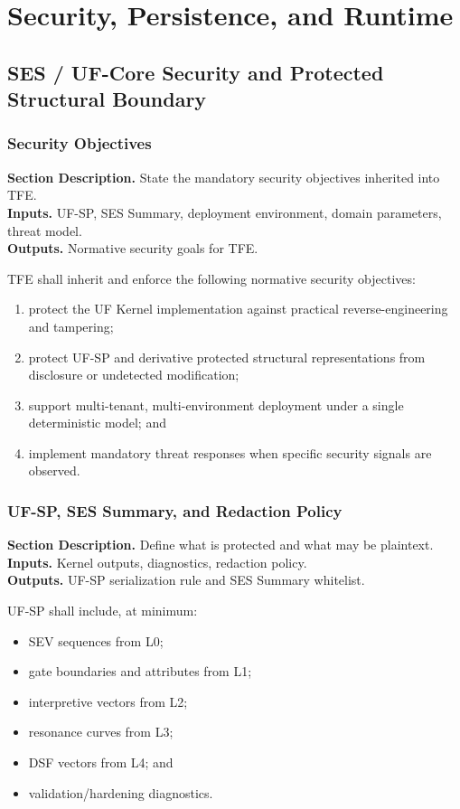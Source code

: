 \documentclass[11pt]{report}
\newcommand{\meta}[3]{\textbf{Section Description.} #1\\
\textbf{Inputs.} #2\\
\textbf{Outputs.} #3\par}
\begin{document}
\part{Security, Persistence, and Runtime}

\chapter{SES / UF-Core Security and Protected Structural Boundary}
\section{Security Objectives}
\meta{State the mandatory security objectives inherited into TFE.}{UF-SP, SES Summary, deployment environment, domain parameters, threat model.}{Normative security goals for TFE.}

TFE shall inherit and enforce the following normative security objectives:
\begin{enumerate}[leftmargin=1.2cm]
    \item protect the UF Kernel implementation against practical reverse-engineering and tampering;
    \item protect UF-SP and derivative protected structural representations from disclosure or undetected modification;
    \item support multi-tenant, multi-environment deployment under a single deterministic model; and
    \item implement mandatory threat responses when specific security signals are observed.
\end{enumerate}

\section{UF-SP, SES Summary, and Redaction Policy}
\meta{Define what is protected and what may be plaintext.}{Kernel outputs, diagnostics, redaction policy.}{UF-SP serialization rule and SES Summary whitelist.}

UF-SP shall include, at minimum:
\begin{itemize}
    \item SEV sequences from L0;
    \item gate boundaries and attributes from L1;
    \item interpretive vectors from L2;
    \item resonance curves from L3;
    \item DSF vectors from L4; and
    \item validation/hardening diagnostics.
\end{itemize}
\end{document}
